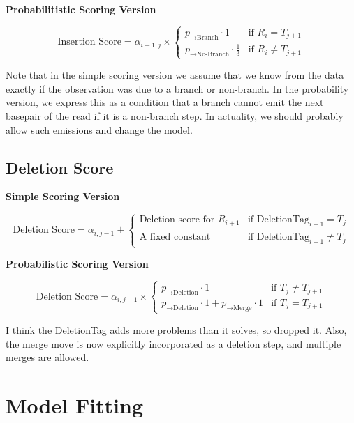 \documentclass[paper=a4, fontsize=11pt]{scrartcl}
\numberwithin{equation}{section}		%
\numberwithin{figure}{section}			%
\numberwithin{table}{section}				%
\begin{document}
\textbf{Probabilitistic Scoring Version}

\[
	\text{Insertion Score} = \alpha_{i-1,j}  \times  \begin{cases}
							 p_{\rightarrow \text{Branch}} \cdot 1   & \text{if }  R_{i} = T_{j+1} \\
							 p_{\rightarrow \text{No-Branch}}  \cdot \frac{1}{3} & \text{if }  R_{i}  \neq T_{j+1} 
							 \end{cases}
\]

Note that in the simple scoring version we assume that we know from the data exactly if the observation was due to a branch or non-branch.  In the probability version, we express this as a condition that a branch cannot emit the next basepair of the read if it is a non-branch step.  In actuality, we should probably allow such emissions and change the model.


\subsection{\textbf{Deletion Score}}

\textbf{Simple Scoring Version}

\[
	\text{Deletion Score} = \alpha_{i,j-1}  +  \begin{cases}
							 \text{Deletion score  for } R_{i+1}  & \text{if }  \text{DeletionTag}_{i+1} = T_{j} \\
							 \text{A fixed constant} & \text{if }  \text{DeletionTag}_{i+1} \neq T_{j} 
							 \end{cases}
\]

\textbf{Probabilistic Scoring Version}

\[
	\text{Deletion Score} = \alpha_{i,j-1}  \times  \begin{cases}
							 p_{ \rightarrow \text{Deletion}} \cdot 1 & \text{if }   T_{j} \neq T_{j+1} \\
							 p_{ \rightarrow \text{Deletion}} \cdot 1 + p_{\rightarrow \text{Merge}}  \cdot 1  & \text{if }  T_{j} = T_{j+1} 
	\end{cases}
\]

I think the DeletionTag adds more problems than it solves, so dropped it.  Also, the merge move is now explicitly incorporated as a deletion step, and multiple merges are allowed.
 
 
\section{Model Fitting}
\end{document}
